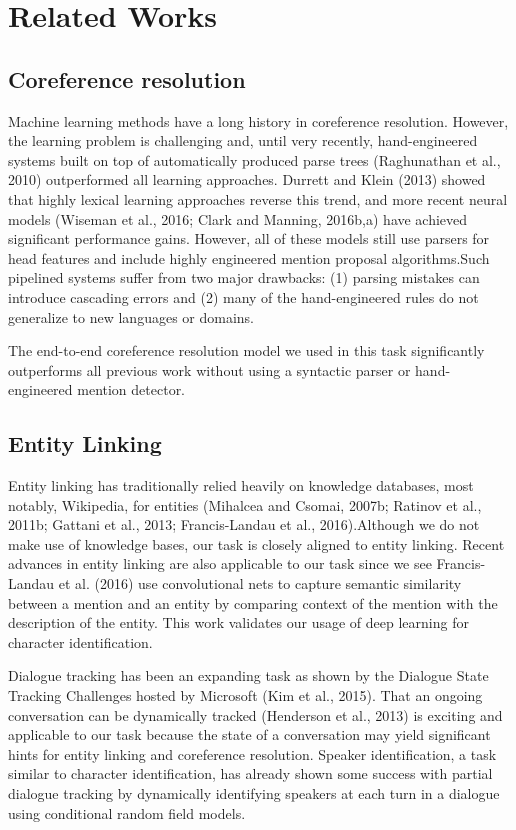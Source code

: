 \documentclass[11pt]{article}
\begin{document}
\section{Related Works}
\subsection{Coreference resolution}
Machine learning methods have a long history in coreference resolution. However, the learning problem is challenging and, until very recently, hand-engineered systems built on top of automatically produced parse trees (Raghunathan et al., 2010) outperformed all learning approaches. Durrett and Klein (2013) showed that highly lexical learning approaches reverse this trend, and more recent neural models (Wiseman et al., 2016; Clark and Manning, 2016b,a) have achieved significant performance gains. However, all of these models still use parsers for head features and include highly engineered mention proposal algorithms.Such pipelined systems suffer from two major drawbacks: (1) parsing mistakes can introduce cascading errors and (2) many of the hand-engineered rules do not generalize to new languages or domains.  

The end-to-end coreference resolution model we used in this task significantly outperforms all previous work without using a syntactic parser or hand-engineered mention detector.

\subsection{Entity Linking}

Entity linking has traditionally relied heavily on knowledge databases, most notably, Wikipedia, for entities (Mihalcea and Csomai, 2007b; Ratinov et al., 2011b; Gattani et al., 2013; Francis-Landau et al., 2016).Although we do not make use of knowledge bases, our task is closely aligned to entity linking. Recent advances in entity linking are
also applicable to our task since we see Francis-Landau et al. (2016) use convolutional nets to capture semantic similarity between a mention and an entity by comparing context of the mention with the description of the entity. This work validates our usage of deep learning for character identification.

Dialogue tracking has been an expanding task as shown by the Dialogue State Tracking Challenges hosted by Microsoft (Kim et al., 2015). That an ongoing conversation can be dynamically tracked (Henderson et al., 2013) is exciting and applicable to our task because the state of a conversation may yield significant hints for entity linking and coreference resolution. Speaker identification, a task similar to character identification, has already shown some success with partial dialogue tracking by dynamically identifying speakers at each turn in a dialogue using conditional random field models.
\end{document}
